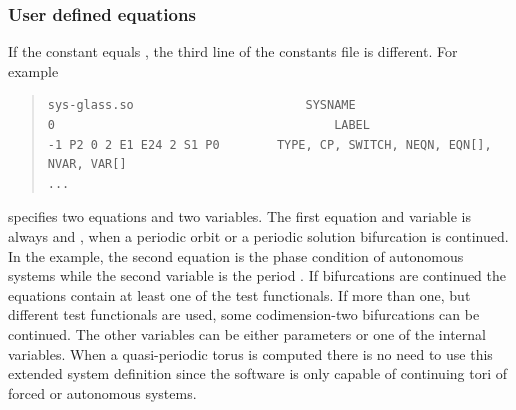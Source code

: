 \documentclass[10pt,a4paper]{ddedoc}
\begin{document}
\subsubsection{User defined equations}
If the  constant equals , the third line of the constants
file is different. For example
{ \small \begin{quote} \begin{lstlisting}[basicstyle=\tt,frame=single]
sys-glass.so						SYSNAME
0										LABEL
-1 P2 0 2 E1 E24 2 S1 P0		TYPE, CP, SWITCH, NEQN, EQN[], NVAR, VAR[]
...
\end{lstlisting} \end{quote} } \noindent
specifies two equations and two variables. The first equation and variable is
always  and , when a periodic orbit or a periodic solution
bifurcation is continued. In the example, the second equation  is the
phase condition of autonomous systems while the second variable is the period
. If bifurcations are continued the equations contain at least one of
the test functionals. If more than one, but different test functionals are used,
some codimension-two bifurcations can be continued. The other variables can be
either parameters or one of the internal variables. When a quasi-periodic torus
is computed there is no need to use this extended system definition since the
software is only capable of continuing tori of forced or autonomous systems.
\end{document}
